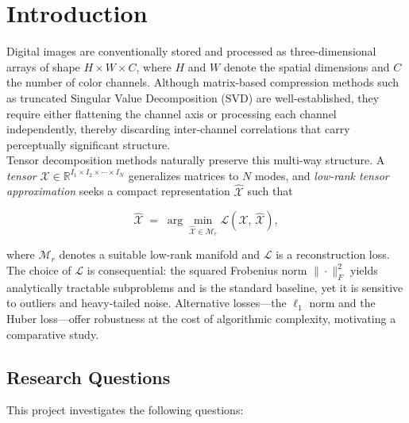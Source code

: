 \section{Introduction}
    Digital images are conventionally stored and processed as three-dimensional arrays of shape $H \times W \times C$, where $H$ and $W$ denote the spatial dimensions and $C$ the number of color channels. Although matrix-based compression methods such as truncated Singular Value Decomposition (SVD) are well-established, they require either flattening the channel axis or processing each channel independently, thereby discarding inter-channel correlations that carry perceptually significant structure.\\

    Tensor decomposition methods naturally preserve this multi-way structure. A \emph{tensor} $\mathcal{X} \in \mathbb{R}^{I_1 \times I_2 \times \cdots \times I_N}$ generalizes matrices to $N$ modes, and \emph{low-rank tensor approximation} seeks a compact representation $\hat{\mathcal{X}}$ such that

    \begin{equation}
        \hat{\mathcal{X}} \;=\; \arg\min_{\hat{\mathcal{X}} \in \mathcal{M}_r}
        \mathcal{L}\!\left(\mathcal{X},\, \hat{\mathcal{X}}\right),
        \label{eq:general_problem}
    \end{equation}

    \noindent where $\mathcal{M}_r$ denotes a suitable low-rank manifold and $\mathcal{L}$ is a reconstruction loss. The choice of $\mathcal{L}$ is consequential: the squared Frobenius norm $\|\cdot\|_F^2$ yields analytically tractable subproblems and is the standard baseline, yet it is sensitive to outliers and heavy-tailed noise. Alternative losses---the $\ell_1$ norm and the Huber loss---offer robustness at the cost of algorithmic complexity, motivating a comparative study.\\

    \subsection*{Research Questions}
        This project investigates the following questions:


